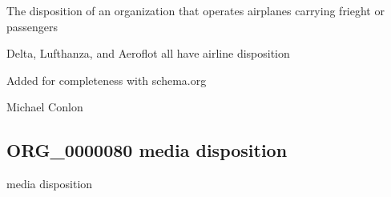 \documentclass[letterpaper,10pt,english]{sphinxmanual}
\begin{document}
\begin{sphinxShadowBox}

\sphinxAtStartPar
{\hyperref[\detokenize{doc-BFO_0000016::doc}]{}}
\end{sphinxShadowBox}

\begin{sphinxShadowBox}

\sphinxAtStartPar
The disposition of an organization that operates airplanes carrying frieght or passengers
\end{sphinxShadowBox}

\begin{sphinxShadowBox}

\sphinxAtStartPar
{}
\end{sphinxShadowBox}

\begin{sphinxShadowBox}

\sphinxAtStartPar
Delta, Lufthanza, and Aeroflot all have airline disposition
\end{sphinxShadowBox}

\begin{sphinxShadowBox}

\sphinxAtStartPar
Added for completeness with schema.org
\end{sphinxShadowBox}

\begin{sphinxShadowBox}

\sphinxAtStartPar
Michael Conlon 
\end{sphinxShadowBox}
\begin{quote}

\ignorespaces \end{quote}


\subsection{ORG\_0000080 \sphinxhyphen{} media disposition}
\label{\detokenize{doc-ORG_0000080:org-0000080-media-disposition}}\label{\detokenize{doc-ORG_0000080:index-0}}\label{\detokenize{doc-ORG_0000080::doc}}
\begin{sphinxShadowBox}

\sphinxAtStartPar
media disposition
\end{sphinxShadowBox}
\end{document}
